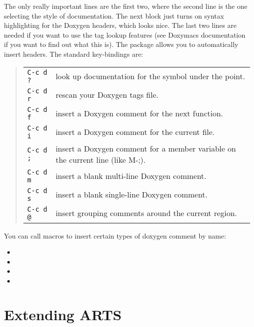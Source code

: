 The only really important lines are the first two, where the second
line is the one selecting the style of documentation. The next block
just turns on syntax highlighting for the Doxygen headers, which looks
nice. The last two lines are needed if you want to use the tag lookup
features (see Doxymacs documentation if you want to find out what this
is).  The package allows you to automatically insert headers. The
standard key-bindings are:
\begin{quote}
    \begin{tabularx}{.8\hsize}{@{}lX}
        \texttt{C-c d ?} & look up documentation for the symbol under the point.\\
        \texttt{C-c d r} & rescan your Doxygen tags file.\\
        \texttt{C-c d f} & insert a Doxygen comment for the next function.\\
        \texttt{C-c d i} & insert a Doxygen comment for the current file.\\
        \texttt{C-c d ;} & insert a Doxygen comment for a member variable on the current line (like M-;).\\
        \texttt{C-c d m} & insert a blank multi-line Doxygen comment.\\
        \texttt{C-c d s} & insert a blank single-line Doxygen comment.\\
        \texttt{C-c d @} & insert grouping comments around the current region.\\
    \end{tabularx}
\end{quote}

You can call macros to insert certain types of doxygen comment by name:

\begin{itemize}
\item {}
\item {}
\item {}
\item {}
\end{itemize}


\section{Extending ARTS}
\label{sec:development:extending}

